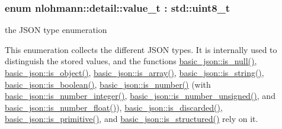 \subsubsection[{\texorpdfstring{value\+\_\+t}{value_t}}]{\setlength{\rightskip}{0pt plus 5cm}enum {\bf nlohmann\+::detail\+::value\+\_\+t} \+: std\+::uint8\+\_\+t\hspace{0.3cm}{\ttfamily [strong]}}\hypertarget{namespacenlohmann_1_1detail_a1ed8fc6239da25abcaf681d30ace4985}{}\label{namespacenlohmann_1_1detail_a1ed8fc6239da25abcaf681d30ace4985}


the J\+S\+ON type enumeration 

This enumeration collects the different J\+S\+ON types. It is internally used to distinguish the stored values, and the functions \hyperlink{classnlohmann_1_1basic__json_a8faa039ca82427ed29c486ffd00600c3}{basic\+\_\+json\+::is\+\_\+null()}, \hyperlink{classnlohmann_1_1basic__json_af8f511af124e82e4579f444b4175787c}{basic\+\_\+json\+::is\+\_\+object()}, \hyperlink{classnlohmann_1_1basic__json_aef9ce5dd2381caee1f8ddcdb5bdd9c65}{basic\+\_\+json\+::is\+\_\+array()}, \hyperlink{classnlohmann_1_1basic__json_a69b596a4a6683b362095c9a139637396}{basic\+\_\+json\+::is\+\_\+string()}, \hyperlink{classnlohmann_1_1basic__json_a943e8cb182d0f2365c76d64b42eaa6fd}{basic\+\_\+json\+::is\+\_\+boolean()}, \hyperlink{classnlohmann_1_1basic__json_a2b9852390abb4b1ef5fac6984e2fc0f3}{basic\+\_\+json\+::is\+\_\+number()} (with \hyperlink{classnlohmann_1_1basic__json_abac8af76067f1e8fdca9052882c74428}{basic\+\_\+json\+::is\+\_\+number\+\_\+integer()}, \hyperlink{classnlohmann_1_1basic__json_abc7378cba0613a78b9aad1c8e7044bb0}{basic\+\_\+json\+::is\+\_\+number\+\_\+unsigned()}, and \hyperlink{classnlohmann_1_1basic__json_a33b4bf898b857c962e798fc7f6e86e70}{basic\+\_\+json\+::is\+\_\+number\+\_\+float()}), \hyperlink{classnlohmann_1_1basic__json_aabe623bc8304c2ba92d96d91f390fab4}{basic\+\_\+json\+::is\+\_\+discarded()}, \hyperlink{classnlohmann_1_1basic__json_a6362b88718eb5c6d4fed6a61eed44b95}{basic\+\_\+json\+::is\+\_\+primitive()}, and \hyperlink{classnlohmann_1_1basic__json_a9f68a0af820c3ced7f9d17851ce4c22d}{basic\+\_\+json\+::is\+\_\+structured()} rely on it.

